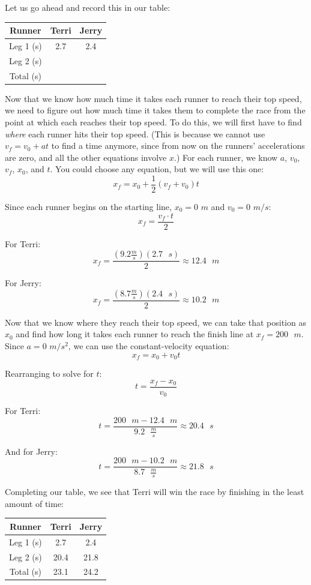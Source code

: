 \begin{Worked}
\begin{Solution}
Let us go ahead and record this in our table:
\begin{center}
\begin{tabular}{|c|c|c|}
\hline
Runner & Terri & Jerry\\\hline
Leg 1 (s) & 2.7 & 2.4 \\\hline
Leg 2 (s) & & \\\hline
Total (s) & & \\\hline
\end{tabular}
\end{center}

Now that we know how much time it takes each runner to reach their top speed, we 
need to figure out how much time it takes them to complete the race from the 
point at which each reaches their top speed. To do this, we will first have to 
find \textit{where} each runner hits their top speed. (This is because we cannot 
use $v_f = v_0 + at$ to find a time anymore, since from now on the runners' 
accelerations are zero, and all the other equations involve $x$.) For each 
runner, we know $a$, $v_0$, $v_f$, $x_0$, and $t$. You could choose any equation, 
but we will use this one:
$$x_f = x_0 + \frac{1}{2} \left( v_f + v_0 \right)t$$

Since each runner begins on the starting line, $x_0 = 0$ $m$ and $v_0 = 0$ $m/s$:
$$x_f = \frac{v_f \cdot t}{2}$$

For Terri:
$$x_f = \frac{\left(9.2 \frac{m}{s} \right) \left(2.7\text{ }s \right)}{2} 
\approx 12.4 \text{ }m$$

For Jerry:
$$x_f = \frac{\left( 8.7 \frac{m}{s} \right) \left( 2.4 \text{ }s \right)}{2} 
\approx 10.2 \text{ }m$$

Now that we know where they reach their top speed, we can take that position as 
$x_0$ and find how long it takes each runner to reach the finish line at $x_f = 
200\text{ }m$. Since $a = 0$ $m/s^2$, we can use the constant-velocity equation:
$$x_f = x_0 + v_0 t$$

Rearranging to solve for $t$:
$$t = \frac{x_f - x_0}{v_0}$$

For Terri:
$$t = \frac{200 \text{ } m - 12.4 \text{ } m}{9.2 \text{ } \frac{m}{s}} \approx 
20.4\text{ }s$$

And for Jerry:
$$t = \frac{200 \text{ } m - 10.2 \text{ } m}{8.7 \text{ } \frac{m}{s}} \approx 
21.8 \text{ } s$$

Completing our table, we see that Terri will win the race by finishing in the 
least amount of time:
\begin{center}
\begin{tabular}{|c|c|c|}
\hline
Runner & Terri & Jerry\\\hline
Leg 1 (s) & 2.7 & 2.4 \\\hline
Leg 2 (s) & 20.4 & 21.8 \\\hline
Total (s) & 23.1 & 24.2 \\\hline
\end{tabular}
\end{center}
\end{Solution}
\end{Worked}

